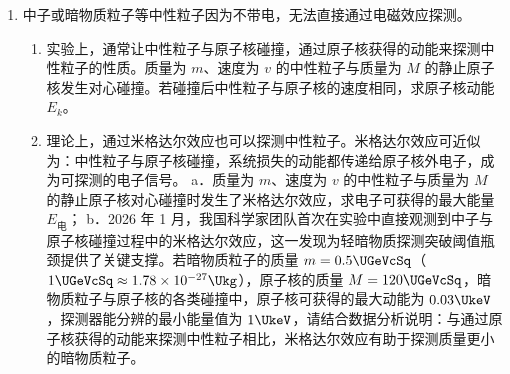 \documentclass[\gkver]{gaokaozhenti}
\begin{document}
\begin{enumerate}
{若仅加匀强磁场，洛伦兹力提供向心力，轨道半径满足 $qv'B=m\frac{v'^{2}}{r}$，

得 $r=\frac{mv'}{qB}=\frac{1}{B}\sqrt{\frac{2mU_{2}}{q}}$。

可见轨道半径 $r$ 与子离子的比荷 $\frac{q}{m}$ 有关，不同比荷的子离子加速后速度不同，在同一匀强磁场中做圆周运动的半径各不相同，无法保证所有子离子都以固定半径 $r$ 做圆周运动，因此仅施加匀强磁场不可行。

b．仅施加电场可行，需施加以 $O$ 为圆心的径向辐向电场。

若仅施加电场，要让所有子离子都以 $O$ 为圆心、$r$ 为半径做匀速圆周运动，电场力需完全提供向心力，且电场方向始终指向圆心。

设距离 $O$ 点 $r$ 处的电场强度大小为 $E$，对任意子离子有 $qE=m\frac{v'^{2}}{r}$，

结合子离子的加速动能关系 $qU_{2}=\frac{1}{2}mv'^{2}$，

代入得 $E=\frac{mv'^{2}}{qr}=\frac{2qU_{2}}{qr}=\frac{2U_{2}}{r}$。

该结果与子离子的比荷 $\frac{q}{m}$ 无关，只要 D 区是辐向电场，在半径为 $r$ 的圆周上各处电场强度大小恒为 $\frac{2U_{2}}{r}$、方向沿径向指向圆心，不同比荷的子离子就都能获得大小合适的向心力，完成半径为 $r$ 的匀速圆周运动，最终从 S 垂直射出，因此仅施加该种径向电场是可行的。
}
\item
中子或暗物质粒子等中性粒子因为不带电，无法直接通过电磁效应探测。
\begin{enumerate}
	\item
	实验上，通常让中性粒子与原子核碰撞，通过原子核获得的动能来探测中性粒子的性质。质量为 $m$、速度为 $v$ 的中性粒子与质量为 $M$ 的静止原子核发生对心碰撞。若碰撞后中性粒子与原子核的速度相同，求原子核动能 $E_{k}$。
	\item
	理论上，通过米格达尔效应也可以探测中性粒子。米格达尔效应可近似为：中性粒子与原子核碰撞，系统损失的动能都传递给原子核外电子，成为可探测的电子信号。
	a．质量为 $m$、速度为 $v$ 的中性粒子与质量为 $M$ 的静止原子核对心碰撞时发生了米格达尔效应，求电子可获得的最大能量 $E_{\text{电}}$；
	b．2026 年 1 月，我国科学家团队首次在实验中直接观测到中子与原子核碰撞过程中的米格达尔效应，这一发现为轻暗物质探测突破阈值瓶颈提供了关键支撑。若暗物质粒子的质量 $m=0.5\UGeVcSq$（$1\UGeVcSq\approx1.78\times10^{-27}\Ukg$），原子核的质量 $M=120\UGeVcSq$，暗物质粒子与原子核的各类碰撞中，原子核可获得的最大动能为 $0.03\UkeV$，探测器能分辨的最小能量值为 $1\UkeV$，请结合数据分析说明：与通过原子核获得的动能来探测中性粒子相比，米格达尔效应有助于探测质量更小的暗物质粒子。
\end{enumerate}
\end{enumerate}
\end{document}
